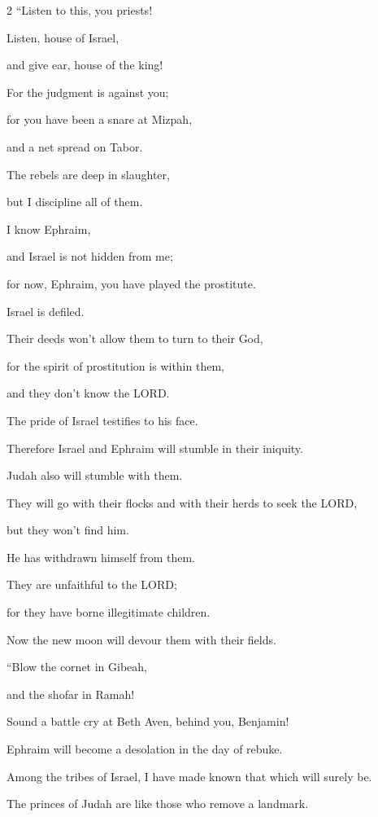 \begin{multicols}{2}
\mychapter{} \myverse*{}“Listen to this, you priests!

Listen, house of Israel,

and give ear, house of the king!

For the judgment is against you;

for you have been a snare at Mizpah,

and a net spread on Tabor.

\myverse{}The rebels are deep in slaughter,

but I discipline all of them.

\myverse{}I know Ephraim,

and Israel is not hidden from me;

for now, Ephraim, you have played the prostitute.

Israel is defiled.

\myverse{}Their deeds won’t allow them to turn to their God,

for the spirit of prostitution is within them,

and they don’t know the LORD.

\myverse{}The pride of Israel testifies to his face.

Therefore Israel and Ephraim will stumble in their iniquity.

Judah also will stumble with them.

\myverse{}They will go with their flocks and with their herds to seek the
LORD,

but they won’t find him.

He has withdrawn himself from them.

\myverse{}They are unfaithful to the LORD;

for they have borne illegitimate children.

Now the new moon will devour them with their fields.


\vspace{\baselineskip} \myverse{}“Blow the cornet in Gibeah,

and the shofar in Ramah!

Sound a battle cry at Beth Aven, behind you, Benjamin!

\myverse{}Ephraim will become a desolation in the day of rebuke.

Among the tribes of Israel, I have made known that which will surely be.

\myverse{}The princes of Judah are like those who remove a landmark.


\end{multicols}
